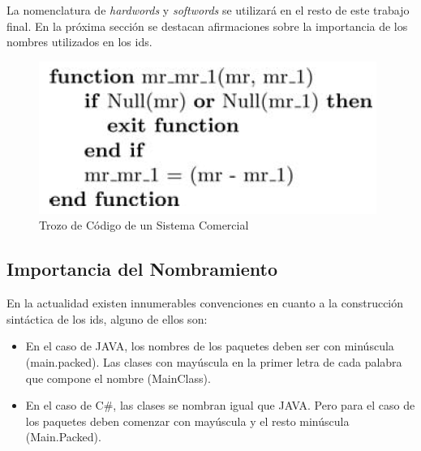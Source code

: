 \documentclass[a4paper,12pt]{report}
\begin{document}
La nomenclatura de \textit{hardwords} y \textit{softwords} se utilizará en el resto de este trabajo final. En la próxima sección se destacan afirmaciones sobre la importancia de los nombres utilizados en los ids.




\begin{figure}[t] %
\centering
\includegraphics[scale= 0.70]{./idd_1.png}
\caption{Trozo de Código de un Sistema Comercial}
\label{captura2}
\end{figure} 

\subsection{Importancia del Nombramiento}
En la actualidad existen innumerables convenciones en cuanto a la construcción sintáctica de los ids, alguno de ellos son:

\begin{itemize}
\itemsep0em%
\item En el caso de JAVA, los nombres de los paquetes deben ser con minúscula (main.packed). Las clases con mayúscula en la primer letra de cada palabra que compone el nombre (MainClass).

\item En el caso de C\#, las clases se nombran igual que JAVA. Pero para el caso de los paquetes deben comenzar con mayúscula y el resto minúscula (Main.Packed).
\end{itemize}
\end{document}
